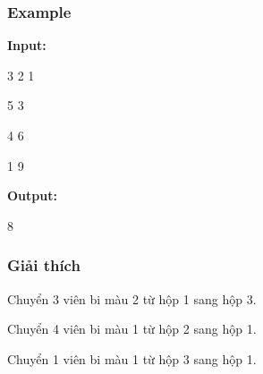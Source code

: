 \subsubsection{   Example  }

\textbf{    Input:   }

   3 2 1  

   5 3  

   4 6  

   1 9  

\textbf{    Output:   }

   8  

\subsubsection{   Giải thích  }

   Chuyển 3 viên bi màu 2 từ hộp 1 sang hộp 3.  

   Chuyển 4 viên bi màu 1 từ hộp 2 sang hộp 1.  

   Chuyển 1 viên bi màu 1 từ hộp 3 sang hộp 1.  
